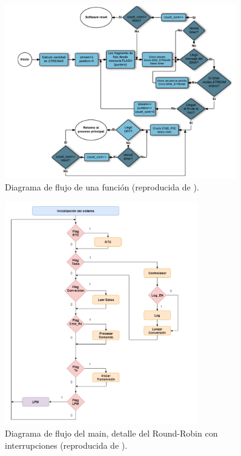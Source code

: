 \documentclass[a4paper,12pt]{article}
\begin{document}
\begin{linenumbers}
\begin{figure}[ht]
  \begin{center}
    \includegraphics[width=0.9\textwidth]{figura4.pdf}
  \end{center}
  \caption{Diagrama de flujo de una función (reproducida de \cite{arbio2015}). }
  \label{fig:sdcs123432zbkof}
\end{figure}

\begin{figure}[ht]
  \begin{center}
    \includegraphics[width=0.75\textwidth]{figura5.pdf}
  \end{center}
  \caption{Diagrama de flujo del main, detalle del Round-Robin con interrupciones (reproducida de \cite{Iglesias2019}). }
  \label{fig:ijndse320jdnbw3rfa}
\end{figure}


\end{linenumbers}
\end{document}
